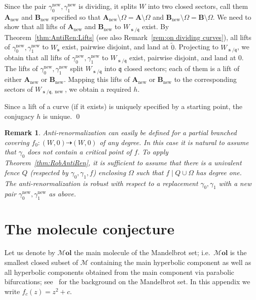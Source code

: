 \documentclass[]{amsart}
\newcommand\MM{\mathcal{M}}
\newcommand\Mol{{\boldsymbol{\mathcal{M}ol }}}
\newcommand\seq{{\operatorname{\mathbf s}}}
\renewcommand{\qq}{\mathfrak{q}}
\newcommand{\A}{\mathbf A}
\newcommand{\B}{\mathbf B}
\newcommand\wall{{Q}}
\newcommand\inn{{\Omega}}
\newcommand\new{{\operatorname{new}}}
\newtheorem{rem}[thm]{Remark}
\theoremstyle{remark}
\numberwithin{equation}{section}
\theoremstyle{definition}
\begin{document}
Since the pair $\gamma^\new_0,\gamma^\new_1$ is dividing, it splits $W$ into two closed sectors, call them $\A_\new$ and $\B_\new$ specified so that $\A_\new\setminus \inn=\A\setminus \inn$ and $\B_\new\setminus \inn=\B\setminus \inn$. We need to show that all lifts of $\A_\new$ and $\B_\new$ to $W_{\seq/\qq}$ exist. By Theorem~\ref{thm:AntiRen:Lifts} (see also Remark~\ref{rem:on dividing curves}), all lifts of $\gamma^\new_0,\gamma^\new_1$ to $W_\seq$ exist, pairwise disjoint, and land at $\widetilde 0$. Projecting to $W_{\seq/\qq}$, we obtain that all lifts of $\gamma^\new_0,\gamma^\new_1$ to $W_{\seq/\qq}$ exist, pairwise disjoint, and land at $0$. The lifts of $\gamma^\new_0,\gamma^\new_1$ split $W_{\seq/\qq}$ into $\qq$ closed sectors; each of them is a lift of either $\A_\new$ or $\B_\new$. Mapping this lifts of $\A_\new$ or $\B_\new$ to the corresponding sectors of $W_{\seq/\qq,\new}$, we obtain a required $h$. 

Since a lift of a curve (if it exists) is uniquely specified by a starting point, the conjugacy $h$ is unique.
\qed


\begin{rem} Anti-renormalization can easily be defined for a partial branched covering $f_0\colon (W,0)\dashrightarrow (W,0)$ of any degree. In this case it is natural to assume that $\gamma_0$ does not contain a critical point of $f$. To apply Theorem~\ref{thm:RobAntiRen}, it is sufficient to assume that there is a \emph{univalent} fence $\wall$ (respected by $\gamma_0,\gamma_1,f$) enclosing $\inn$ such that $f\mid \wall\cup \inn$ has degree one. The anti-renormalization is robust with respect to a replacement $\gamma_0,\gamma_1$ with a new pair $\gamma^\new_0,\gamma^\new_1$ as above.
\end{rem}






\section{The molecule conjecture}
\label{S:ApMolec}
Let us denote by $\Mol$ the main molecule of the Mandelbrot set; i.e.~$\Mol$ is the smallest closed subset of $\MM$ containing the main hyperbolic component as well as all hyperbolic components obtained from the main component via parabolic bifurcations; see~\cites{DH:Orsay,L-book} for the background on the Mandelbrot set. In this appendix we write $f_c(z)=z^2+c$.
\end{document}
